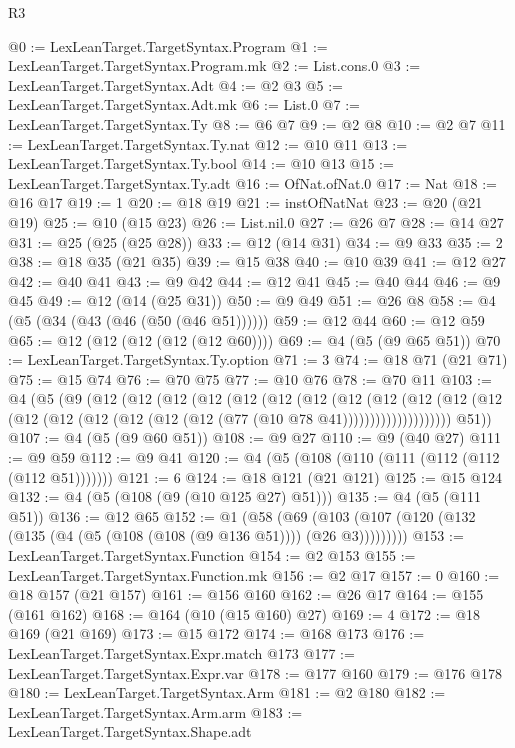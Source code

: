 \begin{lexlean}{R3}
\begin{coremodule}
@0 := LexLeanTarget.TargetSyntax.Program
@1 := LexLeanTarget.TargetSyntax.Program.mk
@2 := List.cons.{0}
@3 := LexLeanTarget.TargetSyntax.Adt
@4 := @2 @3
@5 := LexLeanTarget.TargetSyntax.Adt.mk
@6 := List.{0}
@7 := LexLeanTarget.TargetSyntax.Ty
@8 := @6 @7
@9 := @2 @8
@10 := @2 @7
@11 := LexLeanTarget.TargetSyntax.Ty.nat
@12 := @10 @11
@13 := LexLeanTarget.TargetSyntax.Ty.bool
@14 := @10 @13
@15 := LexLeanTarget.TargetSyntax.Ty.adt
@16 := OfNat.ofNat.{0}
@17 := Nat
@18 := @16 @17
@19 := 1
@20 := @18 @19
@21 := instOfNatNat
@23 := @20 (@21 @19)
@25 := @10 (@15 @23)
@26 := List.nil.{0}
@27 := @26 @7
@28 := @14 @27
@31 := @25 (@25 (@25 @28))
@33 := @12 (@14 @31)
@34 := @9 @33
@35 := 2
@38 := @18 @35 (@21 @35)
@39 := @15 @38
@40 := @10 @39
@41 := @12 @27
@42 := @40 @41
@43 := @9 @42
@44 := @12 @41
@45 := @40 @44
@46 := @9 @45
@49 := @12 (@14 (@25 @31))
@50 := @9 @49
@51 := @26 @8
@58 := @4 (@5 (@34 (@43 (@46 (@50 (@46 @51))))))
@59 := @12 @44
@60 := @12 @59
@65 := @12 (@12 (@12 (@12 (@12 @60))))
@69 := @4 (@5 (@9 @65 @51))
@70 := LexLeanTarget.TargetSyntax.Ty.option
@71 := 3
@74 := @18 @71 (@21 @71)
@75 := @15 @74
@76 := @70 @75
@77 := @10 @76
@78 := @70 @11
@103 := @4
    (@5
      (@9
        (@12
          (@12
            (@12
              (@12
                (@12
                  (@12
                    (@12
                      (@12
                        (@12
                          (@12
                            (@12
                              (@12
                                (@12 (@12 (@12 (@12 (@12 (@12 (@77 (@10 @78 @41))))))))))))))))))))
        @51))
@107 := @4 (@5 (@9 @60 @51))
@108 := @9 @27
@110 := @9 (@40 @27)
@111 := @9 @59
@112 := @9 @41
@120 := @4 (@5 (@108 (@110 (@111 (@112 (@112 (@112 @51)))))))
@121 := 6
@124 := @18 @121 (@21 @121)
@125 := @15 @124
@132 := @4 (@5 (@108 (@9 (@10 @125 @27) @51)))
@135 := @4 (@5 (@111 @51))
@136 := @12 @65
@152 := @1
    (@58 (@69 (@103 (@107 (@120 (@132 (@135 (@4 (@5 (@108 (@108 (@9 @136 @51)))) (@26 @3)))))))))
@153 := LexLeanTarget.TargetSyntax.Function
@154 := @2 @153
@155 := LexLeanTarget.TargetSyntax.Function.mk
@156 := @2 @17
@157 := 0
@160 := @18 @157 (@21 @157)
@161 := @156 @160
@162 := @26 @17
@164 := @155 (@161 @162)
@168 := @164 (@10 (@15 @160) @27)
@169 := 4
@172 := @18 @169 (@21 @169)
@173 := @15 @172
@174 := @168 @173
@176 := LexLeanTarget.TargetSyntax.Expr.match @173
@177 := LexLeanTarget.TargetSyntax.Expr.var
@178 := @177 @160
@179 := @176 @178
@180 := LexLeanTarget.TargetSyntax.Arm
@181 := @2 @180
@182 := LexLeanTarget.TargetSyntax.Arm.arm
@183 := LexLeanTarget.TargetSyntax.Shape.adt

\end{coremodule}
\end{lexlean}
